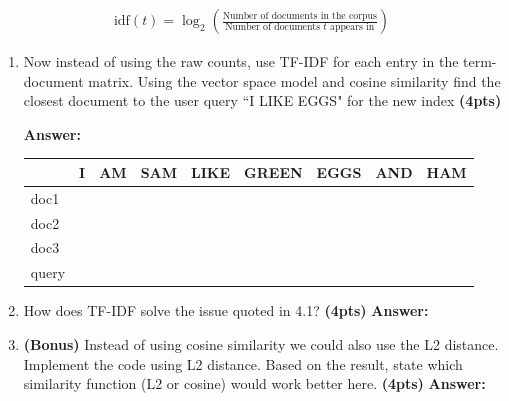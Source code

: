 \documentclass{assignment format}
\newenvironment{answer}{
    {\bf Answer:} \begingroup\color{red}
}{\endgroup}%
\begin{document}
     \begin{align*}
         \text{idf}(t) = \log_2(\frac{\text{Number of documents in the corpus}}{\text{Number of documents $t$ appears in}})
     \end{align*}\begin{enumerate}[label=(\alph*)]
         \item  Now instead of using the raw counts, use TF-IDF for each entry in the term-document matrix. Using the vector space model and cosine similarity find the closest document to the user query ``I LIKE EGGS" for the new index  \textbf{(4pts)}

\begin{answer}
\begin{table}[H]
\centering
\label{tab:my-table}
\begin{tabular}{|l|l|l|l|l|l|l|l|l|}
\hline
     & I & AM & SAM & LIKE & GREEN & EGGS & AND & HAM \\ \hline
doc1 &   &    &     &      &       &      &     &     \\ \hline
doc2 &   &    &     &      &       &      &     &     \\ \hline
doc3 &   &    &     &      &       &      &     &     \\ \hline
query &   &    &     &      &       &      &     &     \\ \hline
\end{tabular}
\end{table}
    \end{answer}
	\item How does TF-IDF solve the issue quoted in 4.1? \textbf{(4pts)}
    \begin{answer}

    \end{answer}
    \item \textbf{(Bonus)} Instead of using cosine similarity we could also use the L2 distance. Implement the code using L2 distance. Based on the result, state which similarity function (L2 or cosine) would work better here.   \textbf{(4pts)}
            \begin{answer}

    \end{answer}

\end{enumerate}
\end{document}

